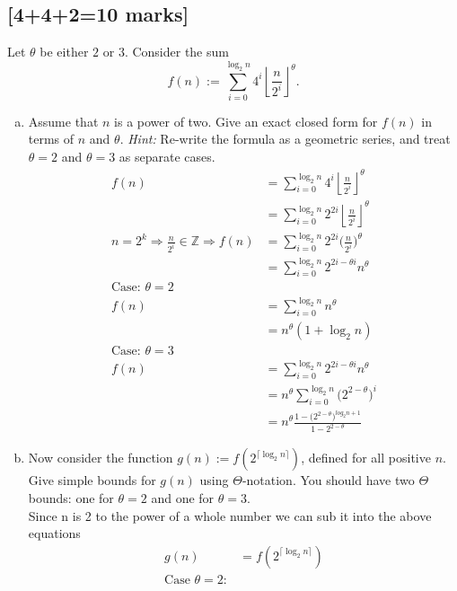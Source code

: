 \documentclass[12pt]{article}
\begin{document}
\subsection{[4+4+2=10 marks]}
Let $\theta$ be either $2$ or $3$. 
Consider the sum
$$f(n) := \sum_{i=0}^{\log_2 n} 4^i \left \lfloor \frac{n}{2^i} \right \rfloor ^{\theta}.$$
\begin{enumerate}[(a)]
\item Assume that $n$ is a power of two. 
Give an exact closed form for $f(n)$ in terms of $n$ and $\theta$.  {\em Hint:} Re-write the formula as a geometric series, and treat $\theta=2$ and $\theta=3$ as separate cases.
\begin{align*}
f(n) &= \sum_{i=0}^{\log_2 n} 4^i \left \lfloor \frac{n}{2^i} \right \rfloor ^{\theta}\\
&= \sum_{i=0}^{\log_2 n} 2^{2i} \left \lfloor \frac{n}{2^i} \right \rfloor ^{\theta}\\
n = 2^k \Rightarrow \frac{n}{2^i} \in \mathbb{Z} \Rightarrow f(n) &=\sum_{i=0}^{\log_2 n} 2^{2i}\bigg (\frac{n}{2^i}\bigg )^{\theta}\\
&=\sum_{i=0}^{\log_2 n} 2^{2i-\theta i} n^{\theta}\\
\text{Case: } \theta = 2 &\\
f(n) &= \sum_{i=0}^{\log_2 n} n^{\theta}\\
&= n^{\theta}(1+ \log_2 n)\\
\text{Case: } \theta = 3\\
f(n)&= \sum_{i=0}^{\log_2 n} 2^{2i-\theta i} n^{\theta}\\
&= n^{\theta} \sum_{i=0}^{\log_2 n} \bigg (2^{2-\theta}\bigg )^i\\
&= n^{\theta}\frac{1-\bigg (2^{2-\theta}\bigg )^{log_2 n + 1}}{1-2^{2-\theta}}
\end{align*}
\item Now consider the function $g(n) := f(2^{\lceil \log_2 n\rceil})$, 
defined for all positive $n$. Give simple bounds for $g(n)$
using $\Theta$-notation. You should have two $\Theta$ bounds: 
one for $\theta=2$ and one for $\theta = 3$.\\
Since n is 2 to the power of a whole number we can sub it into the above equations\\
\begin{align*}
g(n) &= f(2^{\lceil \log_2 n \rceil})\\
\text{Case }\theta = 2:&\\

\end{align*}
\end{enumerate}
\end{document}
